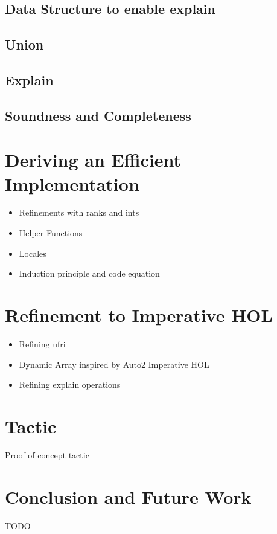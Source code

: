 \documentclass[
  sigplan,
  10pt,
  anonymous,
  review,
  ]{acmart}
\begin{document}
\subsection{Data Structure to enable explain}

\subsection{Union}

\subsection{Explain}

\subsection{Soundness and Completeness}

\section{Deriving an Efficient Implementation}
\begin{itemize}
  \item Refinements with ranks and ints
  \item Helper Functions
  \item Locales
  \item Induction principle and code equation
\end{itemize}

\section{Refinement to Imperative HOL}
\begin{itemize}
  \item Refining ufri
  \item Dynamic Array inspired by Auto2 Imperative HOL
  \item Refining explain operations
\end{itemize}

\section{Tactic}
Proof of concept tactic

\section{Conclusion and Future Work}

\begin{acks}
  TODO
\end{acks}



\end{document}
